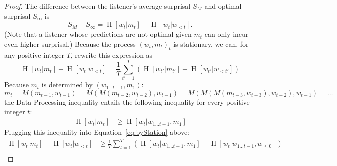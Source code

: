 \documentclass[11pt,letterpaper]{article}
\newcounter{theorem}
\newtheorem{lemma}[theorem]{Lemma}
\begin{document}
\begin{proof}
The difference between the listener's average surprisal $S_M$ and optimal surprisal $S_\infty$ is 
	\begin{equation}
		S_M - S_\infty = \operatorname{H}[w_t | m_t] - \operatorname{H}[w_t | w_{<t}].
	\end{equation}
	(Note that a listener whose predictions are not optimal given $m_t$ can only incur even higher surprisal.)
	Because the process $(w_t, m_t)_t$ is stationary, we can, for any positive integer $T$, rewrite this expression as
\begin{equation}\label{eq:byStation}
\operatorname{H}[w_t | m_t] - \operatorname{H}[w_t | w_{<t}] =  \frac{1}{T} \sum_{t'=1}^{T} \left(\operatorname{H}[w_{t'} | m_{t'}] - \operatorname{H}[w_{t'} | w_{<t'}]\right) 
\end{equation}
%
%
%
Because $m_t$ is determined by $(w_{1 \dots t-1}, m_1)$:
\begin{equation}
	m_t = M(m_{t-1}, w_{t-1}) = M(M(m_{t-2}, w_{t-2}), w_{t-1}) = M(M(M(m_{t-3}, w_{t-3}), w_{t-2}), w_{t-1}) = \dots
\end{equation}
the Data Processing inequality entails the following inequality for every positive integer $t$:
\begin{align}\label{eq:plugged}
\operatorname{H}[w_t | m_t]& \geq \operatorname{H}[w_t|w_{1\dots t-1}, m_1]
\end{align}
Plugging this inequality into Equation~\ref{eq:byStation} above:
\begin{align}\label{eq:plugged}
\operatorname{H}[w_t | m_t] - \operatorname{H}[w_t | w_{<t}]& \geq \frac{1}{T} \sum_{t=1}^T ( \operatorname{H}[w_t|w_{1\dots t-1}, m_1] - \operatorname{H}[w_t | w_{1\dots t-1}, w_{\leq 0}]  )    \\

\end{align}
\end{proof}
\end{document}
